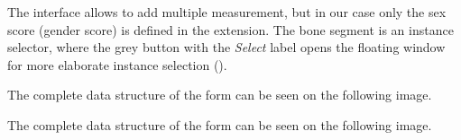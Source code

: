 
The interface allows to add multiple measurement, but in our case only the sex score (gender score) is defined in the extension. The bone segment is an instance selector, where the grey button with the \textit{Select} label opens the floating window for more elaborate instance selection (). 


The complete data structure of the form can be seen on the following image.


The complete data structure of the form can be seen on the following image.



